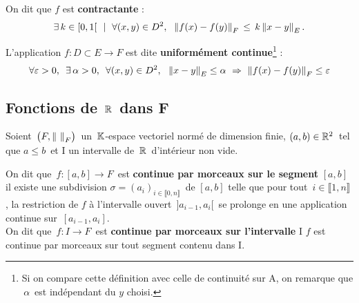 On dit que $f$ est \textbf{contractante} \ssi : \vspace{-0.25cm} \[\exists\,k\in [0,1[\ \ \mid \ \forall(x,y)\in D^2,\ \; \left\lVert f(x)-f(y)\right\rVert_F\,\leq\, k\left\lVert x-y\right\rVert_E.\]

\vspace{1.7cm}

L'application \(f:D\subset E\to F\) est dite \textbf{uniformément continue}\footnote{Si on compare cette définition avec celle de continuité sur A, on remarque que $\,\alpha\,$ est indépendant du $y$ choisi.} \ssi : \vspace{-0.25cm} \[\forall \varepsilon >0,\ \,\exists\, \alpha>0,\ \, \forall(x,y)\in D^2,\ \ \norm{x-y}_E\leq \alpha \ \Rightarrow \ \norm{f(x)-f(y)}_F\leq \varepsilon\]

\newpage

\subsection{Fonctions de $\,\mathbb{R}\,$ dans F}

\vspace*{1cm}

\begin{center}
    Soient \(\,\bigl(F,\norm{\ }_F\bigr)\,\) un $\,\mathbb{K}$-espace vectoriel normé de dimension finie, \((a,b)\in\mathbb{R}^2\,\) tel que \(a\leq b\,\) et I un intervalle de $\,\mathbb{R}\,$ d'intérieur non vide.
\end{center}

\vspace{0.9cm}

On dit que \(\,f:[a,b]\to F\, \) est \textbf{continue par morceaux sur le segment} $[a,b]$ \ssi il existe une subdivision \(\sigma =(a_i)_{i\in \llbracket 0,n \rrbracket}\,\) de \([a,b]\) telle que pour tout \(\,i\in \llbracket 1,n \rrbracket\,\), la restriction de $f$ à l'intervalle ouvert \(\,]a_{i-1},a_i[\,\) se prolonge en une application continue sur \(\,[a_{i-1},a_i].\)\vspace{0.3cm}\\
On dit que \(\,f:I\to F\,\) est \textbf{continue par morceaux sur l'intervalle} I \ssi $f$ est continue par morceaux sur tout segment contenu dans I.

\vspace{2cm}

